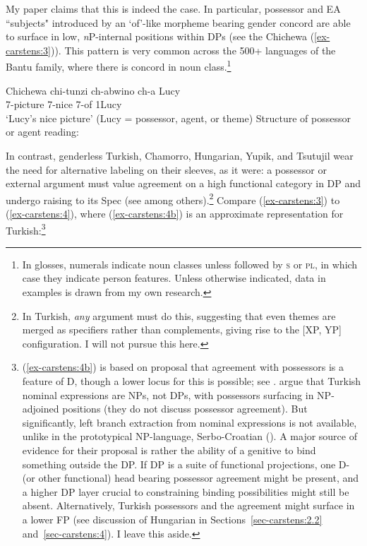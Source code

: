 \documentclass[output=paper
,modfonts
,nonflat]{langsci/langscibook}
\begin{document}
My paper claims that this is indeed the case. In particular, possessor and EA ``subjects" introduced by an `of'-like morpheme bearing gender concord are able to surface in low, \textit{n}P-internal positions within DPs (see the Chichewa (\ref{ex-carstens:3})). This pattern is very common across the 500+ languages of the Bantu family, where there is concord in noun class.\footnote{In glosses, numerals indicate noun classes unless followed by \textsc{s} or \textsc{pl}, in which case they indicate person features. Unless otherwise indicated, data in examples is drawn from my own research.}

	\begin{exe}
		\ex Chichewa \citep[372, 374]{Carstens1997} \label{ex-carstens:3}
		\xlist
		\ex \label{ex-carstens:3a}
		\gll chi-tunzi     ch-abwino     ch-a   Lucy\\
		7-picture   7-nice       7-of     1Lucy\\
		\glt `Lucy's nice picture' (Lucy = possessor, agent, or theme)	
		\ex Structure of possessor or agent reading: \newline
		\endxlist
\end{exe}
In contrast, genderless Turkish, Chamorro, Hungarian, Yupik, and Tsutujil wear the need for alternative labeling on their sleeves, as it were: a possessor or external argument must value agreement on a high functional category in DP and undergo raising to its Spec (see \citealt{Abney1987} among others).\footnote{In Turkish, \textit{any} argument must do this, suggesting that even themes are merged as specifiers rather than complements, giving rise to the [XP, YP] configuration. I will not pursue this here.} Compare (\ref{ex-carstens:3}) to (\ref{ex-carstens:4}), where (\ref{ex-carstens:4b}) is an approximate representation for Turkish:\footnote{(\ref{ex-carstens:4b}) is based on  proposal that agreement with possessors is a feature of D, though a lower locus for this is possible; see . \citet{Boskovic_Sener2014} argue that Turkish nominal expressions are NPs, not DPs, with possessors surfacing in NP-adjoined positions (they do not discuss possessor agreement). But significantly, left branch extraction from nominal expressions is not available, unlike in the prototypical NP-language, Serbo-Croatian (\citealt{Boskovic2005}). A major source of evidence for their proposal is rather the ability of a genitive to bind something outside the DP. If DP is a suite of functional projections, one D- (or other functional) head bearing possessor agreement might be present, and a higher DP layer crucial to constraining binding possibilities might still be absent. Alternatively, Turkish possessors and the agreement might surface in a lower FP (see discussion of Hungarian in Sections~\ref{sec-carstens:2.2} and~\ref{sec-carstens:4}). I leave this aside.}
\end{document}
